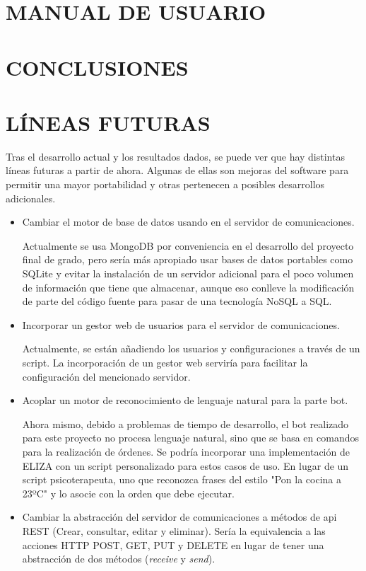 \documentclass[spanish,12pt, a4paper, twoside]{paper}
\let\oldsection\section
\def\section{\cleardoublepage\oldsection}
\begin{document}
\section{MANUAL DE USUARIO}

\section{CONCLUSIONES}

\section{LÍNEAS FUTURAS}

Tras el desarrollo actual y los resultados dados, se puede ver que hay distintas líneas futuras a partir de ahora. Algunas de ellas son mejoras del software para permitir una mayor portabilidad y otras pertenecen a posibles desarrollos adicionales.

\begin{itemize}
\item Cambiar el motor de base de datos usando en el servidor de comunicaciones. 

Actualmente se usa MongoDB por conveniencia en el desarrollo del proyecto final de grado, pero sería más apropiado usar bases de datos portables como SQLite y evitar la instalación de un servidor adicional para el poco volumen de información que tiene que almacenar, aunque eso conlleve la modificación de parte del código fuente para pasar de una tecnología NoSQL a SQL.

\item Incorporar un gestor web de usuarios para el servidor de comunicaciones.

Actualmente, se están añadiendo los usuarios y configuraciones a través de un script. La incorporación de un gestor web serviría para facilitar la configuración del mencionado servidor.

\item Acoplar un motor de reconocimiento de lenguaje natural para la parte bot.

Ahora mismo, debido a problemas de tiempo de desarrollo, el bot realizado para este proyecto no procesa lenguaje natural, sino que se basa en comandos para la realización de órdenes. Se podría incorporar una implementación de ELIZA con un script personalizado para estos casos de uso. En lugar de un script psicoterapeuta, uno que reconozca frases del estilo "Pon la cocina a 23ºC" y lo asocie con la orden que debe ejecutar.

\item Cambiar la abstracción del servidor de comunicaciones a métodos de api REST (Crear, consultar, editar y eliminar). Sería la equivalencia a las acciones HTTP POST, GET, PUT y DELETE en lugar de tener una abstracción de dos métodos (\emph{receive} y \emph{send}).
\end{itemize}
\end{document}
